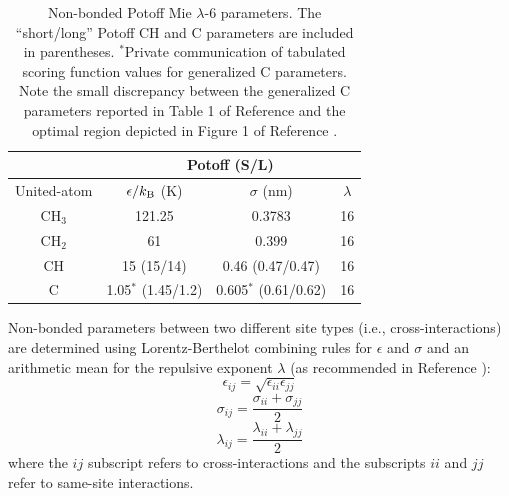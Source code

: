\documentclass[preprint,review,12pt]{elsarticle}
\begin{document}
	\begin{table}[h!]
		\caption{Non-bonded Potoff Mie $\lambda$-6 parameters. The ``short/long'' Potoff CH and C parameters are included in parentheses. $^*$Private communication of tabulated scoring function values for generalized C parameters. Note the small discrepancy between the generalized C parameters reported in Table 1 of Reference  and the optimal region depicted in Figure 1 of Reference .} \label{tab:nonbonded params}
		\begin{center}
			\begin{tabular}{|c|c|c|c|}
				\hline
				\multicolumn{1}{|c}{} & \multicolumn{3}{|c|}{Potoff (S/L)}  \\ \hline
				United-atom & $\epsilon/k_{\rm B}$ (K) & $\sigma$ (nm) & $\lambda$ \\ \hline
				CH$_3$ & 121.25 & 0.3783 & 16  \\ 
				CH$_2$ & 61 & 0.399 & 16 \\ 
				CH & 15 (15/14) & 0.46 (0.47/0.47) & 16\\
				C & 1.05$^*$ (1.45/1.2) & 0.605$^*$ (0.61/0.62) & 16\\
				\hline
			\end{tabular}
		\end{center} 
	\end{table}
	
	Non-bonded parameters between two different site types (i.e., cross-interactions) are determined using Lorentz-Berthelot combining rules \cite{Allen2017} for $\epsilon$ and $\sigma$ and an arithmetic mean for the repulsive exponent $\lambda$ (as recommended in Reference ):
	\begin{equation} \label{eq:Lorentz-Berthelot_eps}
	\epsilon_{ij} = \sqrt{\epsilon_{ii} \epsilon_{jj}}
	\end{equation}
	\begin{equation} \label{eq:Lorentz-Berthelot_sig}
	\sigma_{ij} = \frac{\sigma_{ii} + \sigma_{jj}}{2}
	\end{equation}
	\begin{equation} \label{eq:Lorentz-Berthelot_lam}
	\lambda_{ij} = \frac{\lambda_{ii} + \lambda_{jj}}{2}
	\end{equation}
	where the $ij$ subscript refers to cross-interactions and the subscripts $ii$ and $jj$ refer to same-site interactions. 
	
%	
\end{document}

